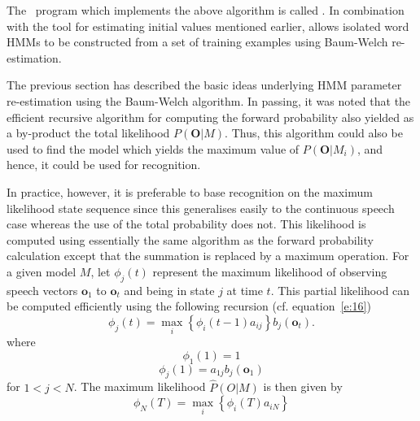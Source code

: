The \HTK\ program which implements the above 
algorithm is called .  
In combination with the tool  for
estimating initial values mentioned earlier,  allows isolated
word HMMs to be constructed from a set of training examples
using Baum-Welch re-estimation.


The previous section has described the basic ideas underlying
HMM parameter re-estima\-tion using the Baum-Welch algorithm.
In passing, it was noted that the efficient recursive
algorithm for computing the forward probability also yielded
as a by-product the total likelihood 
$P(\bm{O}|M)$.  Thus, this
algorithm could also be used to find the model which yields
the maximum value of $P(\bm{O}|M_i)$, and hence, it could be used
for recognition.

In practice, however, it is preferable to base recognition
on the maximum likelihood state sequence since this generalises
easily to the continuous speech case whereas the use
of the total probability does not.  This likelihood is 
computed using essentially the same algorithm as the forward
probability calculation except that the summation is replaced
by a maximum operation.  For a given model $M$, 
let $\phi_j(t)$ represent the 
maximum likelihood of observing speech vectors $\bm{o}_1$ to
$\bm{o}_t$ and being in state $j$ at time $t$.
This partial likelihood can be computed efficiently using
the following recursion (cf. equation~\ref{e:16})
\begin{equation} \label{e:27}
    \phi_j(t) = \max_i \left\{ \phi_i(t-1) a_{ij} \right\}
                     b_j(\bm{o}_t).
\end{equation}
where
\begin{equation}
    \phi_1(1) = 1
\end{equation}
\begin{equation}
    \phi_j(1) = a_{1j} b_j(\bm{o}_1)
\end{equation}
for $1<j<N$.  The maximum likelihood $\hat{P}(O|M)$ is then given by
\begin{equation}
    \phi_N(T) = \max_i \left\{ \phi_i(T) a_{iN} \right\}
\end{equation}

